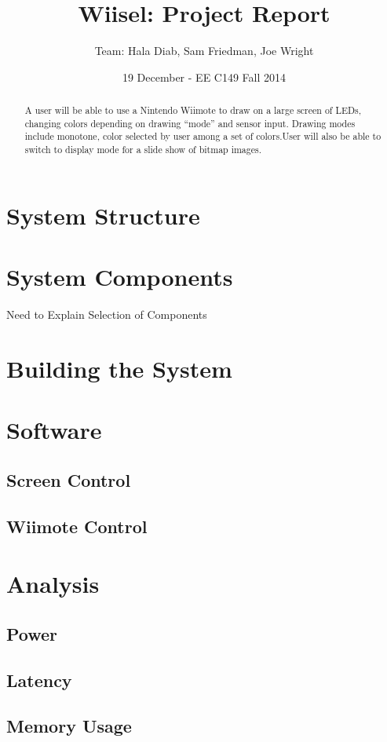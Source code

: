 \documentclass{tufte-handout}
\title{Wiisel: Project Report}
\author{Team: Hala Diab, Sam Friedman, Joe Wright}
\date{19 December - EE C149 Fall 2014}
\begin{document}
\maketitle
\begin{abstract}
    A user will be able to use a Nintendo Wiimote to draw on a large screen of
LEDs, changing colors depending
on drawing ``mode'' and sensor input. Drawing modes include monotone, color selected by user among a set of colors.User will also be able to switch to display mode for a slide show of bitmap images.
\end{abstract}

\section{\textbf{System Structure}}
\section{\textbf{System Components}}
Need to Explain Selection of Components
\section{\textbf{Building the System}}
\section{\textbf{Software}}
\subsection{Screen Control}
\subsection{Wiimote Control}
\section{\textbf{Analysis}}
\subsection{Power}
\subsection{Latency}
\subsection{Memory Usage}
\end{document}
